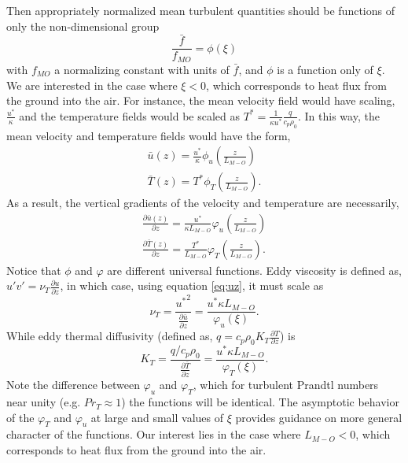 Then appropriately normalized mean turbulent quantities should be
functions of only the non-dimensional group 
\begin{equation}
 \frac{\bar f}{f_{MO}} = \phi(\xi)
\end{equation}
with $f_{MO}$ a normalizing constant with units of $\bar f$, and $\phi$
is a function only of $\xi$. We are interested in the case where
$\xi<0$, which corresponds to heat flux from the ground into the
air. For instance, the mean velocity field would have scaling,
$\frac{u^*}{\kappa}$ and the temperature fields would be scaled as $T^*
= \frac{1}{\kappa u^*} \frac{q}{c_p \rho_0}$. In this way, the mean
velocity and temperature fields would have the form,  
\begin{eqnarray}
\bar u(z) = \frac{u^*}{\kappa} \phi_u(\frac{z}{L_{M-O}}) \\
\bar T(z) = T^* \phi_T(\frac{z}{L_{M-O}}).
\end{eqnarray}
As a result, the vertical gradients of the velocity and temperature are
necessarily, 
\begin{eqnarray}
\frac{\partial \bar u(z)}{\partial z} = \frac{u^*}{\kappa L_{M-O}}
 \varphi_u(\frac{z}{L_{M-O}}) \label{eq:uz} \\ 
\frac{\partial \bar T(z)}{\partial z} = \frac{T^*}{L_{M-O}}
 \varphi_T(\frac{z}{L_{M-O}}) \label{eq:tz}.
\end{eqnarray}
Notice that $\phi$ and $\varphi$ are different universal functions. Eddy
viscosity is defined as, $u'v' = \nu_T \frac{\partial
u}{\partial z}$\cite{durbin2001statistical}, in which case, using
equation \ref{eq:uz}, it must scale as
\begin{equation}
 \nu_T = \frac{{u^*}^2}{\frac{\partial \bar u}{\partial z}} = \frac{u^*
  \kappa L_{M-O}}{\varphi_u(\xi)}.
\end{equation}
While eddy thermal diffusivity (defined as, $q = c_p \rho_0 K_T
\frac{\partial T}{\partial z}$) is 
\begin{equation}
 K_T = \frac{q/c_p \rho_0}{\frac{\partial \bar T}{\partial z}} = \frac{u^*
  \kappa L_{M-O}}{\varphi_T(\xi)}.
\label{eqn:eddy_kt}
\end{equation}
Note the difference between $\varphi_u$ and
$\varphi_T$, which for turbulent Prandtl numbers near unity (e.g. $Pr_T
\approx 1$) the functions will be identical. The asymptotic behavior of
the $\varphi_T$ and $\varphi_u$ at large and small values of $\xi$
provides guidance on more general character of the functions. 
Our interest lies in the case where $L_{M-O}<0$, which corresponds to heat flux
from the ground into the air.  
%


